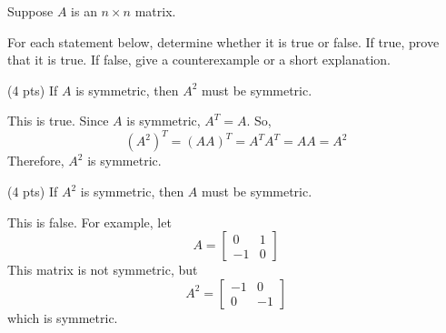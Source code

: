 \documentclass[11pt]{article}
\begin{document}
\newpage

\begin{prob}[(12 pts)]
Suppose $A$ is an $n \times n$ matrix.

For each statement below, determine whether it is true or false. If true, prove that it is true. If false, give a counterexample or a short explanation.

\begin{subprob}(4 pts) If $A$ is symmetric, then $A^2$ must be symmetric.

   

  \par\noindent\emptybox{5cm}

  \begin{solution}
  This is true. Since $A$ is symmetric, $A^T = A$. So,
  \[
  (A^2)^T = (AA)^T = A^T A^T = AA = A^2
  \]
  Therefore, $A^2$ is symmetric.
  \end{solution}

\end{subprob}

\begin{subprob}(4 pts) If $A^2$ is symmetric, then $A$ must be symmetric.

   

  \par\noindent\emptybox{5cm}

  \begin{solution}
  This is false. For example, let
  \[
  A =
  \begin{bmatrix}
  0 & 1 \\
  -1 & 0
  \end{bmatrix}
  \]
  This matrix is not symmetric, but
  \[
  A^2 =
  \begin{bmatrix}
  -1 & 0 \\
  0 & -1
  \end{bmatrix}
  \]
  which is symmetric.


\end{solution}
\end{subprob}
\end{prob}
\end{document}
